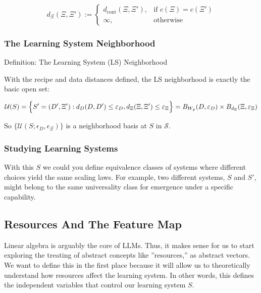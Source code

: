 \documentclass[12pt]{article}
\begin{document}
\[
d_\Xi(\Xi,\Xi') :=
\begin{cases}
d_{\text{cont}}(\Xi,\Xi'),& \text{if } c(\Xi)=c(\Xi')\\
\infty, &\text{otherwise}
\end{cases}
\]

\subsubsection{The Learning System Neighborhood}

\begin{statementbox}{Definition: The Learning System (LS) Neighborhood}

With the recipe and data distances defined, the LS neighborhood is exactly the basic open set:

\[
\mathcal U(S)=\Bigl\{S'=(D',\Xi'):d_D(D,D')\le\varepsilon_D, d_\Xi(\Xi,\Xi')\le\varepsilon_\Xi\Bigr\}
\\= B_{W_p}(D,\varepsilon_D)\times B_{d_\Xi}(\Xi,\varepsilon_\Xi)
\]

So $\{\mathcal U (S;\epsilon_D,\epsilon_\Xi)\}$ is a neighborhood basis at $S$ in $\mathcal S$. 

\end{statementbox}

\subsubsection{Studying Learning Systems}

With this $S$ we could you define equivalence classes of systems where different choices yield the same scaling laws. For example, two different systems, $S$ and $S'$, might belong to the same universality class for emergence under a specific capability.

\subsection{Resources And The Feature Map}

Linear algebra is arguably the core of LLMs. Thus, it makes sense for us to start exploring the treating of abstract concepts like ”resources,” as abstract vectors. We want to define this in the first place because it will allow us to theoretically understand how resources affect the learning system. In other words, this defines the independent variables that control our learning system $S$.
\end{document}
